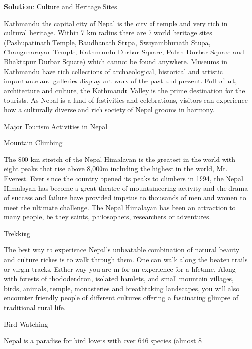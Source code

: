 \documentclass[
  openany]{book}
\newenvironment{solution}{ {\bfseries Solution}:}{}
\begin{document}
\begin{questions}
\begin{solution}
Culture and Heritage Sites

Kathmandu the capital city of Nepal is the city of temple and very rich in cultural heritage. Within 7 km radius there are 7 world heritage sites (Pashupatinath Temple, Baudhanath Stupa, Swayambhunath Stupa, Changunarayan Temple, Kathmandu Durbar Square, Patan Durbar Square and Bhaktapur Durbar Square) which cannot be found anywhere. Museums in Kathmandu have rich collections of archaeological, historical and artistic importance and galleries display art work of the past and present. Full of art, architecture and culture, the Kathmandu Valley is the prime destination for the tourists. As Nepal is a land of festivities and celebrations, visitors can experience how a culturally diverse and rich society of Nepal grooms in harmony.

Major Tourism Activities in Nepal

Mountain Climbing

The 800 km stretch of the Nepal Himalayan is the greatest in the world with eight peaks that rise above 8,000m including the highest in the world, Mt. Everest. Ever since the country opened its peaks to climbers in 1994, the Nepal Himalayan has become a great theatre of mountaineering activity and the drama of success and failure have provided impetus to thousands of men and women to meet the ultimate challenge. The Nepal Himalayan has been an attraction to many people, be they saints, philosophers, researchers or adventures.

Trekking

The best way to experience Nepal’s unbeatable combination of natural beauty and culture riches is to walk through them. One can walk along the beaten trails or virgin tracks. Either way you are in for an experience for a lifetime. Along with forests of rhododendron, isolated hamlets, and small mountain villages, birds, animals, temple, monasteries and breathtaking landscapes, you will also encounter friendly people of different cultures offering a fascinating glimpse of traditional rural life.

Bird Watching

Nepal is a paradise for bird lovers with over 646 species (almost 8%


\end{solution}
\end{questions}
\end{document}
